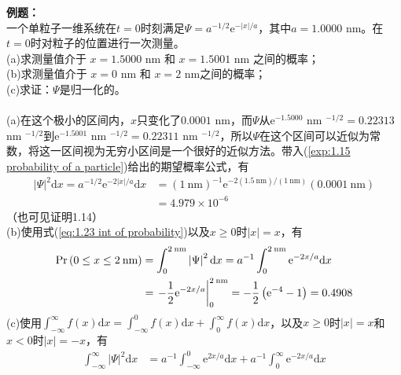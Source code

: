 	\begin{examplebox}
		\textbf{例题：}\\
		一个单粒子一维系统在$t=0$时刻满足$\Psi = a^{-1/2}\mathrm{e}^{-\left|x\right|/a}$，其中$a = 1.0000$ nm。在$t=0$时对粒子的位置进行一次测量。\\
		(a)求测量值介于 $x = 1.5000$ nm 和 $x = 1.5001$ nm 之间的概率；\\
		(b)求测量值介于 $x = 0$ nm 和 $x = 2$ nm之间的概率；\\
		(c)求证：$\Psi$是归一化的。\\
		\\
		(a)在这个极小的区间内，$x$只变化了$0.0001$ nm，而$\Psi$从$\mathrm{e}^{-1.5000}$ nm $^{-1/2} = 0.22313$ nm $^{-1/2}$到$\mathrm{e}^{-1.5001}$ nm $^{-1/2} = 0.22311$ nm $^{-1/2}$，所以$\Psi$在这个区间可以近似为常数，将这一区间视为无穷小区间是一个很好的近似方法。带入(\ref{exp:1.15 probability of a particle})给出的期望概率公式，有
		\begin{equation*}
			\begin{aligned}
				\left|\Psi\right|^2 \mathrm{d}x = a^{-1/2} \mathrm{e}^{-2\left|x\right|/a}\mathrm{d}x & = \left(1 \: \text{nm}\right)^{-1} \mathrm{e}^{-2\left(1.5 \: \text{nm}\right)/\left(1 \:\text{nm}\right)}\left(0.0001 \:\text{nm}\right)\\
				& = 4.979 \times 10^{-6}
			\end{aligned}
		\end{equation*}	
		（也可见证明1.14）\\
		(b)使用式(\ref{eq:1.23 int of probability})以及$x \ge 0$时$\left|x\right| = x$，有
		\begin{equation*}
			\begin{aligned}
				\text{Pr} \left(0 \le x \le 2 \: \text{nm}\right) & = \int_{0}^{2 \: \text{nm}}\left|\Psi\right|^2 \mathrm{d}x  = a^{-1} \int_{0}^{2 \: \text{nm}} \mathrm{e}^{-2x/a}\mathrm{d}x\\
				& = \eval{-\frac{1}{2}\mathrm{e}^{-2x/a}}_{0}^{2 \: \text{nm}} = -\frac{1}{2}\left(\mathrm{e}^{-4}-1\right) = 0.4908
			\end{aligned}
		\end{equation*}
		(c)使用$\int_{-\infty}^{\infty} f\left(x\right) \mathrm{d}x = \int_{-\infty}^{0} f \left(x\right) \mathrm{d}x+\int_{0}^{\infty} f\left(x\right) \mathrm{d}x$，以及$x \ge 0$时$\left|x\right| = x$和$x < 0$时$\left|x\right| = -x$，有
		\begin{equation*}
			\begin{aligned}
				\int_{-\infty}^{\infty} \left|\Psi\right|^2 \mathrm{d}x  & = a ^{-1}\int_{-\infty}^{0} \mathrm{e}^{2x/a}\mathrm{d}x + a^{-1}\int_{0}^{\infty} \mathrm{e}^{-2x/a}\mathrm{d}x\\

\end{aligned}
\end{equation*}
\end{examplebox}
